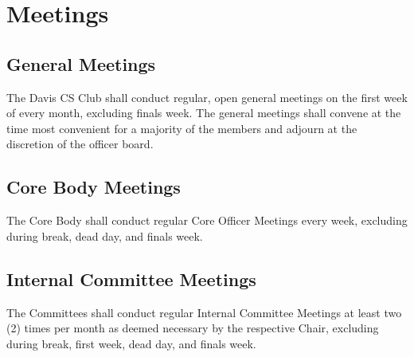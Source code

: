 \documentclass{article}
\begin{document}




\section{Meetings}

\subsection{General Meetings}
The Davis CS Club shall conduct regular, open general meetings on the first week of every month, excluding finals week. The general meetings shall convene at the time most convenient for a majority of the members and adjourn at the discretion of the officer board.

\subsection{Core Body Meetings}
The Core Body shall conduct regular Core Officer Meetings every week, excluding during break, dead day, and finals week.

\subsection{Internal Committee Meetings}
The Committees shall conduct regular Internal Committee Meetings at least two (2) times per month as deemed necessary by the respective Chair, excluding during break, first week, dead day, and finals week.
\end{document}
